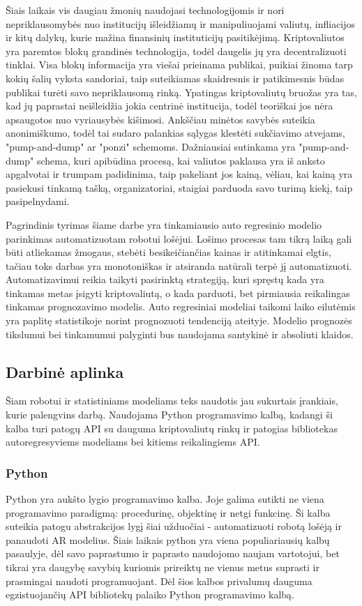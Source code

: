\documentclass{VUMIFInfKursinis}
\begin{document}
Šiais laikais vis daugiau žmonių naudojasi technologijomis ir nori nepriklausomybės nuo institucijų išleidžiamų ir manipuliuojami valiutų, infliacijos ir kitų dalykų, 
kurie mažina finansinių instituticijų pasitikėjimą. Kriptovaliutos yra paremtos blokų grandinės technologija, todėl daugelis jų yra decentralizuoti tinklai. 
Visa blokų informacija yra viešai prieinama publikai, puikiai žinoma tarp kokių šalių vyksta sandoriai, taip suteikiamas skaidresnis ir patikimesnis būdas publikai
turėti savo nepriklausomą rinką. Ypatingas kriptovaliutų bruožas yra tas, kad jų paprastai neišleidžia jokia centrinė institucija, todėl teoriškai jos nėra 
apsaugotos nuo vyriausybės kišimosi. Ankščiau minėtos savybės suteikia anonimiškumo, todėl tai sudaro palankias sąlygas klestėti sukčiavimo atvejams, 
"pump-and-dump" ar "ponzi" schemoms. Dažniausiai sutinkama yra "pump-and-dump" schema, kuri apibūdina procesą, kai valiutos paklausa yra iš anksto
apgalvotai ir trumpam padidinima, taip pakeliant jos kainą, vėliau, kai kainą yra pasiekusi tinkamą tašką, organizatoriai, staigiai parduoda savo
turimą kiekį, taip pasipelnydami\cite{xu2019anatomy}.

Pagrindinis tyrimas šiame darbe yra tinkamiausio auto regresinio modelio parinkimas automatizuotam robotui lošėjui. Lošimo procesas tam tikrą laiką gali būti atliekamas žmogaus, 
stebėti besikeičiančias kainas ir atitinkamai elgtis, tačiau toks darbas yra monotoniškas ir atsiranda natūrali terpė jį automatizuoti. Automatizavimui
reikia taikyti pasirinktą strategiją, kuri spręstų kada yra tinkamas metas įsigyti kriptovaliutą, o kada parduoti, bet pirmiausia reikalingas tinkamas prognozavimo modelis.
Auto regresiniai modeliai taikomi laiko eilutėmis yra paplitę statistikoje norint prognozuoti tendenciją ateityje. Modelio prognozės tikslumui bei tinkamumui palyginti 
bus naudojama santykinė ir absoliuti klaidos.

\subsection{Darbinė aplinka}
Šiam robotui ir statistiniams modeliams teks naudotis jau sukurtais įrankiais, kurie palengvins darbą. Naudojama Python programavimo kalbą, 
kadangi ši kalba turi patogų API su dauguma kriptovaliutų rinkų ir patogias bibliotekas autoregresyviems modeliams bei kitiems reikalingiems API.

\subsubsection{Python}
Python yra aukšto lygio programavimo kalba. Joje galima sutikti ne viena programavimo paradigmą: procedurinę, objektinę ir netgi funkcinę.
Ši kalba suteikia patogu abstrakcijos lygį šiai užduočiai - automatizuoti robotą lošėją ir panaudoti AR modelius.
Šiais laikais python yra viena populiariausių kalbų pasaulyje, dėl savo paprastumo ir paprasto naudojomo naujam vartotojui, bet tikrai yra daugybę savybių
kuriomis prireiktų ne vienus metus suprasti ir prasmingai naudoti programuojant. Dėl šios kalbos privalumų dauguma egzistuojančių API
bibliotekų palaiko Python programavimo kalbą.
\end{document}

